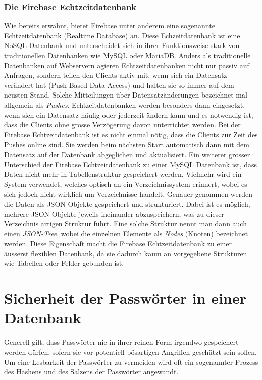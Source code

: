 \documentclass[../main.tex]{subfiles}
\begin{document}
	\subsubsection{Die Firebase Echtzeitdatenbank} \label{firebaseRealtime}
	Wie bereits erwähnt, bietet Firebase unter anderem eine sogenannte Echtzeitdatenbank (Realtime Database) an. Diese Echzeitdatenbank ist eine NoSQL Datenbank und unterscheidet sich in ihrer Funktionsweise stark von traditionellen Datenbanken wie MySQL oder MariaDB. Anders als traditionelle Datenbanken auf Webservern agieren Echtzeitdatenbanken nicht nur passiv auf Anfragen, sondern teilen den Clients aktiv mit, wenn sich ein Datensatz verändert hat (Push-Based Data Access) und halten sie so immer auf dem neusten Stand. Solche Mitteilungen über Datensatzänderungen bezeichnet mal allgemein als \emph{Pushes}. Echtzeitdatenbanken werden besonders dann eingesetzt, wenn sich ein Datensatz häufig oder jederzeit ändern kann und es notwendig ist, dass die Clients ohne grosse Verzögerung davon unterrichtet werden. \cite{RealtimeDatabase} Bei der Firebase Echtzeitdatenbank ist es nicht einmal nötig, dass die Clients zur Zeit des Pushes online sind. Sie werden beim nächsten Start automatisch dann mit dem Datensatz auf der Datenbank abgeglichen und aktualisiert. Ein weiterer grosser Unterschied der Firebase Echtzeitdatenbank zu einer MySQL Datenbank ist, dass Daten nicht mehr in Tabellenstruktur gespeichert werden. Vielmehr wird ein System verwendet, welches optisch an ein Verzeichnissystem erinnert, wobei es sich jedoch nicht wirklich um Verzeichnisse handelt. Genauer genommen werden die Daten als JSON-Objekte gespeichert und strukturiert. Dabei ist es möglich, mehrere JSON-Objekte jeweils ineinander abzuspeichern, was zu dieser Verzeichnis artigen Struktur führt. Eine solche Struktur nennt man dann auch einen \emph{JSON-Tree}, wobei die einzelnen Elemente als \emph{Nodes} (Knoten) bezeichnet werden. Diese Eigenschaft macht die Firebase Echtzeitdatenbank zu einer äusserst flexiblen Datenbank, da sie dadurch kaum an vorgegebene Strukturen wie Tabellen oder Felder gebunden ist. \cite{firebaseStructure}\cite{FirebaseRTDB}
	
	
	\section{Sicherheit der Passwörter in einer Datenbank}
	Generell gilt, dass Passwörter nie in ihrer reinen Form irgendwo gespeichert werden dürfen, sofern sie vor potentiell bösartigen Angriffen geschützt sein sollen. Um eine Lesbarkeit der Passwörter zu vermeiden wird oft ein sogenannter Prozess des Hashens und des Salzens der Passwörter angewandt. 
	
\end{document}
